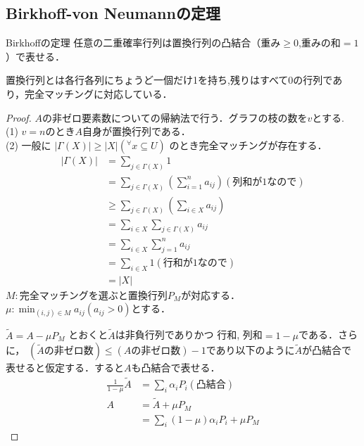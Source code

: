 \subsection{Birkhoff-von Neumannの定理}
\begin{itembox}[l]{Birkhoffの定理}
  任意の二重確率行列は置換行列の凸結合（重み$\geq 0$,重みの和$=1$）で表せる．
\end{itembox}
置換行列とは各行各列にちょうど一個だけ1を持ち,残りはすべて0の行列であり，完全マッチングに対応している．
\begin{proof}
$A$の非ゼロ要素数についての帰納法で行う．グラフの枝の数を$v$とする.\\
(1) $v=n$のとき$A$自身が置換行列である．\\
(2) 一般に
$|\Gamma (X)|\geq |X|({}^{\forall}x\subseteq U)$
のとき完全マッチングが存在する．
\begin{align}
  |\Gamma (X)| &=\sum_{j\in \Gamma (X)}1\\
  &=\sum_{j\in\Gamma (X)}\left(\sum_{i=1}^n a_{ij}\right)
  (列和が1なので)\\
  &\geq \sum_{j\in\Gamma (X)} \left(\sum_{i\in X}a_{ij}\right)\\
  &=\sum_{i\in X}\sum_{j\in\Gamma (X)}a_{ij}\\
  &=\sum_{i\in X}\sum_{j=1}^n a_{ij}\\
  &=\sum_{i\in X}1(行和が1なので)\\
  &=|X|
\end{align}
$M:$完全マッチングを選ぶと置換行列$P_M$が対応する．
$\mu :\min_{(i,j)\in M}a_{ij}(a_{ij} > 0)$とする．

$\tilde{A}=A-\mu P_M$ とおくと$\tilde{A}$は非負行列でありかつ
行和,
列和$=1-\mu$である．さらに，
$(\tilde{A}の非ゼロ数)\leq (Aの非ゼロ数)-1$であり以下のように$\tilde{A}$が凸結合で表せると仮定する．すると$A$も凸結合で表せる．
\begin{align}
  \displaystyle\frac{1}{1-\mu}\tilde{A}&=\sum_{i}{\alpha}_i P_i (凸結合)\\
  A&=\tilde{A}+\mu P_M\\
  &=\displaystyle\sum_i (1-\mu ){\alpha}_i P_i +\mu P_M
\end{align}
\end{proof}
